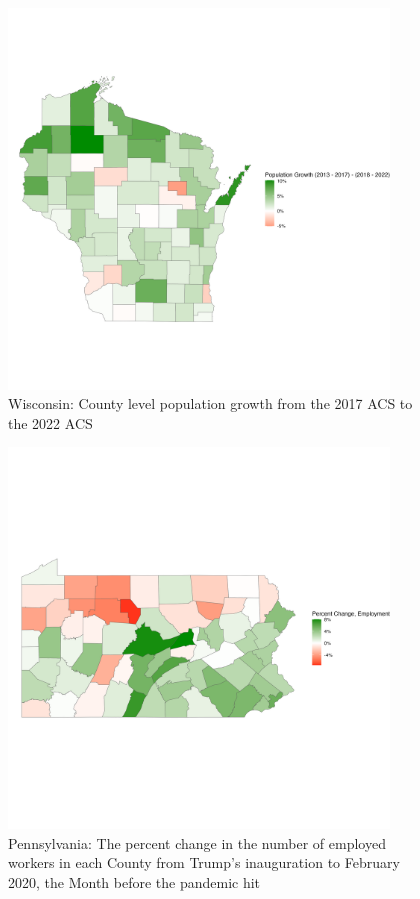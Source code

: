 \documentclass[11pt]{article}
\begin{document}
\begin{figure}
    \centering
    \includegraphics[width=0.9\textwidth]{plots/wi-growth.png}
    \caption{Wisconsin: County level population growth from the 2017 ACS to the 2022 ACS}
\end{figure}
\begin{figure}
   \centering
   \includegraphics[width=0.9\textwidth]{plots/raw-employment-plot-pa.png}
   \caption{Pennsylvania: The percent change in the number of employed workers in each County from Trump's inauguration to February 2020, the Month before the pandemic hit}
\end{figure}
\end{document}
